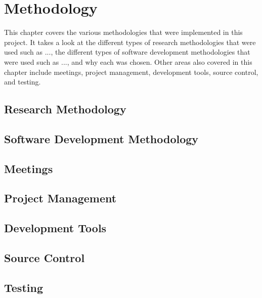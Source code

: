 \chapter{Methodology}
This chapter covers the various methodologies that were implemented in this project. It takes a look at the different types of research methodologies that were used such as ..., the different types of software development methodologies that were used such as ..., and why each was chosen. Other areas also covered in this chapter include meetings, project management, development tools, source control, and testing.

\section{Research Methodology}

\section{Software Development Methodology}

\section{Meetings}

\section{Project Management}

\section{Development Tools}

\section{Source Control}

\section{Testing}